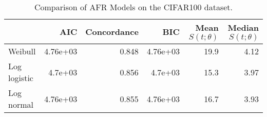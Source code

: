 \begin{table}
\caption{Comparison of AFR Models on the CIFAR100 dataset.}
\label{tab:cifar100}
\begin{tabular}{lrrrrr}
\toprule
 & AIC & Concordance & BIC & Mean $S(t;\theta)$ & Median $S(t;\theta)$ \\
\midrule
Weibull & 4.76e+03 & 0.848 & 4.76e+03 & 19.9 & 4.12 \\
Log logistic & 4.7e+03 & 0.856 & 4.7e+03 & 15.3 & 3.97 \\
Log normal & 4.76e+03 & 0.855 & 4.76e+03 & 16.7 & 3.93 \\
\bottomrule
\end{tabular}
\end{table}
